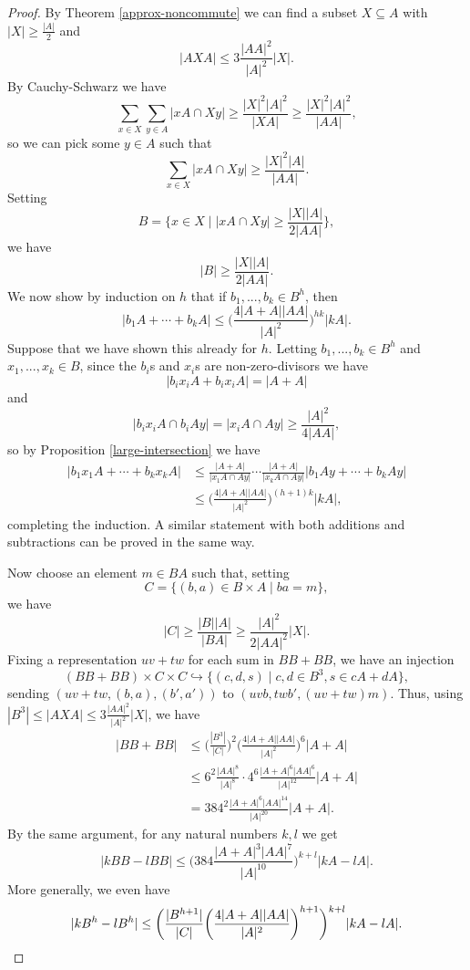 \documentclass[letterpaper,11pt]{article}
\theoremstyle{definition}
\theoremstyle{remark}
\begin{document}
\begin{proof} By Theorem \ref{approx-noncommute} we can find a subset $X\subseteq A$ with $|X| \ge \frac{|A|}{2}$ and
\[
|AXA| \le 3\frac{|AA|^2}{|A|^2}|X|.
\]
By Cauchy-Schwarz we have
\[
\sum_{x\in X}\sum_{y\in A} |xA\cap Xy| \ge \frac{|X|^2|A|^2}{|XA|} \ge \frac{|X|^2|A|^2}{|AA|},
\]
so we can pick some $y \in A$ such that
\[
\sum_{x\in X} |xA\cap Xy| \ge \frac{|X|^2|A|}{|AA|}.
\]
Setting
\[
B = \bigg\{x\in X\mid |xA\cap Xy| \ge \frac{|X||A|}{2|AA|}\bigg\},
\]
we have
\[
|B| \ge \frac{|X||A|}{2|AA|}.
\]
We now show by induction on $h$ that if $b_1, ..., b_k \in B^h$, then
\[
|b_1A + \cdots + b_kA| \le \bigg(\frac{4|A+A||AA|}{|A|^2}\bigg)^{hk}|kA|.
\]
Suppose that we have shown this already for $h$. Letting $b_1, ..., b_k \in B^h$ and $x_1, ..., x_k \in B$, since the $b_i$s and $x_i$s are non-zero-divisors we have
\[
|b_ix_iA + b_ix_iA| = |A+A|
\]
and
\[
|b_ix_iA\cap b_iAy| = |x_iA\cap Ay| \ge \frac{|A|^2}{4|AA|},
\]
so by Proposition \ref{large-intersection} we have
\begin{align*}
|b_1x_1A + \cdots + b_kx_kA| &\le \frac{|A+A|}{|x_1A\cap Ay|}\cdots \frac{|A+A|}{|x_kA\cap Ay|}|b_1Ay+\cdots +b_kAy|\\
&\le \bigg(\frac{4|A+A||AA|}{|A|^2}\bigg)^{(h+1)k}|kA|,
\end{align*}
completing the induction. A similar statement with both additions and subtractions can be proved in the same way.

Now choose an element $m \in BA$ such that, setting
\[
C = \{(b,a)\in B\times A\mid ba = m\},
\]
we have
\[
|C| \ge \frac{|B||A|}{|BA|} \ge \frac{|A|^2}{2|AA|^2}|X|.
\]
Fixing a representation $uv+tw$ for each sum in $BB+BB$, we have an injection
\[
(BB+BB)\times C\times C \hookrightarrow \{(c,d,s)\mid c,d \in B^3, s\in cA+dA\},
\]
sending $(uv+tw,(b,a),(b',a'))$ to $(uvb, twb', (uv+tw)m)$. Thus, using $|B^3| \le |AXA| \le 3\frac{|AA|^2}{|A|^2}|X|$, we have
\begin{align*}
|BB+BB| &\le \bigg(\frac{|B^3|}{|C|}\bigg)^2\bigg(\frac{4|A+A||AA|}{|A|^2}\bigg)^6|A+A|\\
&\le 6^2\frac{|AA|^8}{|A|^8}\cdot 4^6\frac{|A+A|^6|AA|^6}{|A|^{12}}|A+A|\\
&= 384^2\frac{|A+A|^6|AA|^{14}}{|A|^{20}}|A+A|.
\end{align*}
By the same argument, for any natural numbers $k,l$ we get
\[
|kBB-lBB| \le \bigg(384\frac{|A+A|^3|AA|^7}{|A|^{10}}\bigg)^{k+l}|kA-lA|.
\]
More generally, we even have
\[
|kB^h-lB^h| \le \bigg(\frac{|B^{h+1}|}{|C|}\bigg(\frac{4|A+A||AA|}{|A|^2}\bigg)^{h+1}\bigg)^{k+l}|kA-lA|.\qedhere
\]
\end{proof}
\end{document}
